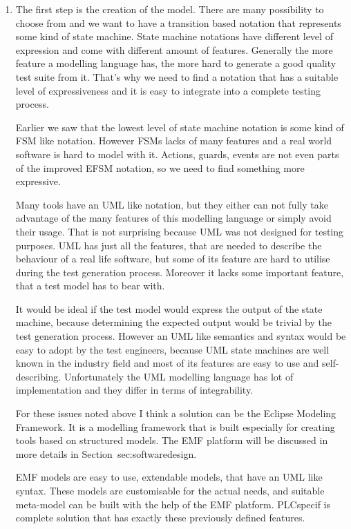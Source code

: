 \begin{enumerate}

\item The first step is the creation of the model. There are many possibility to choose from and we want to have a transition based notation that represents some kind of state machine. State machine notations have different level of expression and come with different amount of features. Generally the more feature a modelling language has, the more hard to generate a good quality test suite from it. That's why we need to find a notation that has a suitable level of expressiveness and it is easy to integrate into a complete testing process.

Earlier we saw that the lowest level of state machine notation is some kind of FSM like notation. However FSMs lacks of many features and a real world software is hard to model with it. Actions, guards, events are not even parts of the improved EFSM notation, so we need to find something more expressive.

Many tools have an UML like notation, but they either can not fully take advantage of the many features of this modelling language or simply avoid their usage. That is not surprising because UML was not designed for testing purposes. UML has just all the features, that are needed to describe the behaviour of a real life software, but some of its feature are hard to utilise during the test generation process. Moreover it lacks some important feature, that a test model has to bear with.

It would be ideal if the test model would express the output of the state machine, because determining the expected output would be trivial by the test generation process. However an UML like semantics and syntax would be easy to adopt by the test engineers, because UML state machines are well known in the industry field and most of its features are easy to use and self-describing. Unfortunately the UML modelling language has lot of implementation and they differ in terms of integrability.

For these issues noted above I think a solution can be the Eclipse Modeling Framework. It is a modelling framework that is built especially for creating tools based on structured models. The EMF platform will be discussed in more details in Section~{sec:softwaredesign}.

EMF models are easy to use, extendable models, that have an UML like syntax.  These models are customisable for the actual needs, and suitable meta-model can be built with the help of the EMF platform. PLCspecif is complete solution that has exactly these previously defined features.


\end{enumerate}
